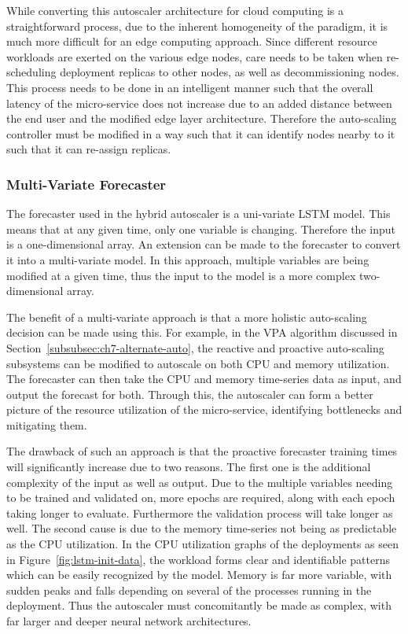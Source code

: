 While converting this autoscaler architecture for cloud computing is a straightforward process, due to the inherent homogeneity of the paradigm, it is much more difficult for an edge computing approach. Since different resource workloads are exerted on the various edge nodes, care needs to be taken when re-scheduling deployment replicas to other nodes, as well as decommissioning nodes. This process needs to be done in an intelligent manner such that the overall latency of the micro-service does not increase due to an added distance between the end user and the modified edge layer architecture. Therefore the auto-scaling controller must be modified in a way such that it can identify nodes nearby to it such that it can re-assign replicas.

\subsubsection{Multi-Variate Forecaster}
\label{subsubsec:ch7-multi-variate}

The forecaster used in the hybrid autoscaler is a uni-variate LSTM model. This means that at any given time, only one variable is changing. Therefore the input is a one-dimensional array. An extension can be made to the forecaster to convert it into a multi-variate model. In this approach, multiple variables are being modified at a given time, thus the input to the model is a more complex two-dimensional array.\par

The benefit of a multi-variate approach is that a more holistic auto-scaling decision can be made using this. For example, in the VPA algorithm discussed in Section~\ref{subsubsec:ch7-alternate-auto}, the reactive and proactive auto-scaling subsystems can be modified to autoscale on both CPU and memory utilization. The forecaster can then take the CPU and memory time-series data as input, and output the forecast for both. Through this, the autoscaler can form a better picture of the resource utilization of the micro-service, identifying bottlenecks and mitigating them.\par

The drawback of such an approach is that the proactive forecaster training times will significantly increase due to two reasons. The first one is the additional complexity of the input as well as output. Due to the multiple variables needing to be trained and validated on, more epochs are required, along with each epoch taking longer to evaluate. Furthermore the validation process will take longer as well. The second cause is due to the memory time-series not being as predictable as the CPU utilization. In the CPU utilization graphs of the deployments as seen in Figure~\ref{fig:lstm-init-data}, the workload forms clear and identifiable patterns which can be easily recognized by the model. Memory is far more variable, with sudden peaks and falls depending on several of the processes running in the deployment. Thus the autoscaler must concomitantly be made as complex, with far larger and deeper neural network architectures.\par

